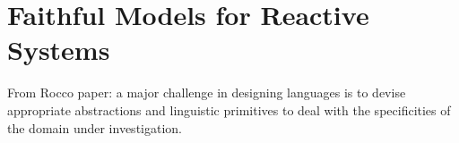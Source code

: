 \section{Faithful Models for Reactive Systems} \label{sec::Faithfulness}
From Rocco paper: a major challenge in designing languages is to devise appropriate abstractions and linguistic primitives to deal with the specificities of the domain under investigation.
